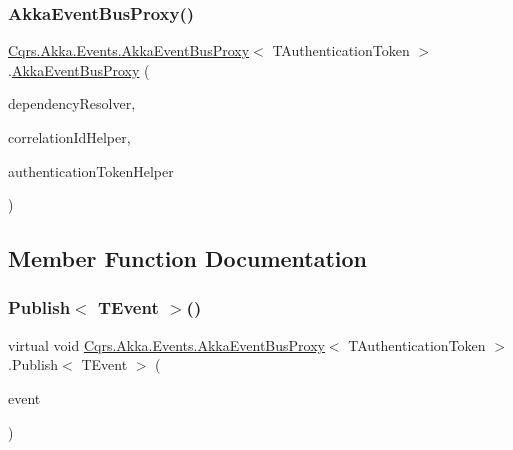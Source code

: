 \subsubsection{\texorpdfstring{Akka\+Event\+Bus\+Proxy()}{AkkaEventBusProxy()}}
{\footnotesize\ttfamily \hyperlink{classCqrs_1_1Akka_1_1Events_1_1AkkaEventBusProxy}{Cqrs.\+Akka.\+Events.\+Akka\+Event\+Bus\+Proxy}$<$ T\+Authentication\+Token $>$.\hyperlink{classCqrs_1_1Akka_1_1Events_1_1AkkaEventBusProxy}{Akka\+Event\+Bus\+Proxy} (\begin{DoxyParamCaption}\item[{\hyperlink{interfaceCqrs_1_1Configuration_1_1IDependencyResolver}{I\+Dependency\+Resolver}}]{dependency\+Resolver,  }\item[{I\+Correlation\+Id\+Helper}]{correlation\+Id\+Helper,  }\item[{\hyperlink{interfaceCqrs_1_1Authentication_1_1IAuthenticationTokenHelper}{I\+Authentication\+Token\+Helper}$<$ T\+Authentication\+Token $>$}]{authentication\+Token\+Helper }\end{DoxyParamCaption})}



\subsection{Member Function Documentation}
\mbox{\label{classCqrs_1_1Akka_1_1Events_1_1AkkaEventBusProxy_a656daead2fe6f30487855dbaea5a3c83}} 
\subsubsection{\texorpdfstring{Publish$<$ T\+Event $>$()}{Publish< TEvent >()}\hspace{0.1cm}{\footnotesize\ttfamily [1/2]}}
{\footnotesize\ttfamily virtual void \hyperlink{classCqrs_1_1Akka_1_1Events_1_1AkkaEventBusProxy}{Cqrs.\+Akka.\+Events.\+Akka\+Event\+Bus\+Proxy}$<$ T\+Authentication\+Token $>$.Publish$<$ T\+Event $>$ (\begin{DoxyParamCaption}\item[{T\+Event @}]{event }\end{DoxyParamCaption})\hspace{0.3cm}{\ttfamily [virtual]}}



